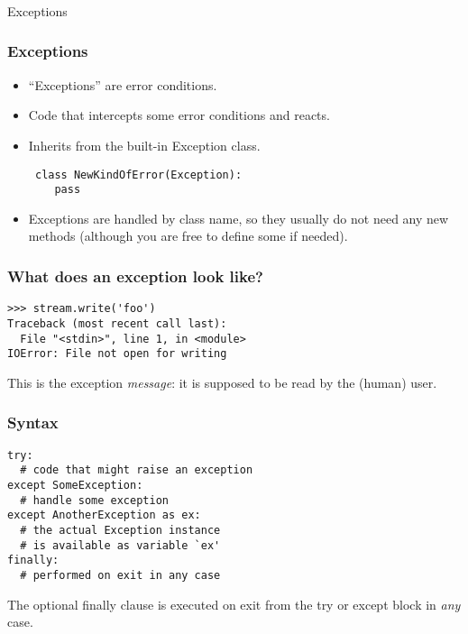 \begin{frame}[fragile]\frametitle{}
\begin{center}
{\Large Exceptions}
\end{center}
\end{frame}


\begin{frame}[fragile]\frametitle{Exceptions}

\begin{itemize}
\item ``Exceptions'' are error conditions.
\item Code that intercepts some error conditions and
  reacts.
\item  Inherits from the built-in  Exception class.

\begin{lstlisting}
 class NewKindOfError(Exception):
    pass
 \end{lstlisting}

\item
   Exceptions are handled by class name, so they usually do not need
   any new methods (although you are free to define some if needed).

\end{itemize}
\end{frame}

\begin{frame}[fragile] \frametitle{What does an exception look like?}
\begin{lstlisting}
>>> stream.write('foo')
Traceback (most recent call last):
  File "<stdin>", line 1, in <module>
IOError: File not open for writing
\end{lstlisting}

  This is the exception \emph{message}: it is supposed to be read
  by the (human) user.
\end{frame}

\begin{frame}[fragile]\frametitle{Syntax}
\begin{lstlisting}
try:
  # code that might raise an exception
except SomeException:
  # handle some exception
except AnotherException as ex:
  # the actual Exception instance
  # is available as variable `ex'
finally:
  # performed on exit in any case
\end{lstlisting}

  The optional finally clause is executed on exit from the
  try or except block in \emph{any} case.
\end{frame}


